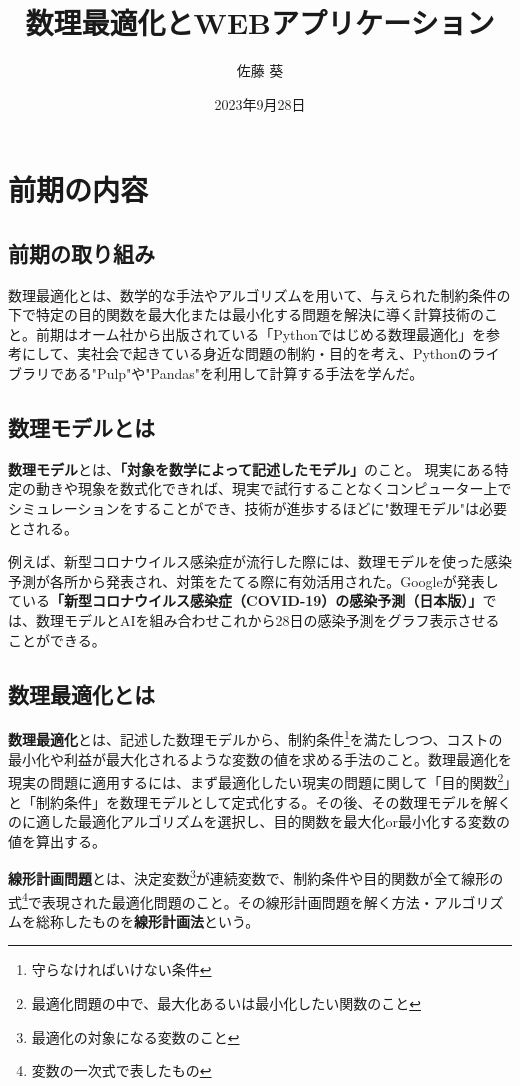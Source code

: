 \documentclass{jsarticle}
\title{数理最適化とWEBアプリケーション}
\date{2023年9月28日}
\author{佐藤 葵}
\begin{document}
\maketitle

\newpage

\tableofcontents
\clearpage

\section{前期の内容}
\vspace\baselineskip	
\subsection{前期の取り組み}
数理最適化とは、数学的な手法やアルゴリズムを用いて、与えられた制約条件の下で特定の目的関数を最大化または最小化する問題を解決に導く計算技術のこと。前期はオーム社から出版されている「Pythonではじめる数理最適化」\cite{参考書}を参考にして、実社会で起きている身近な問題の制約・目的を考え、Pythonのライブラリである"Pulp"や"Pandas"を利用して計算する手法を学んだ。

\subsection{数理モデルとは}
{\bf 数理モデル}とは、{\bf「対象を数学によって記述したモデル」}のこと。 現実にある特定の動きや現象を数式化できれば、現実で試行することなくコンピューター上でシミュレーションをすることができ、技術が進歩するほどに"数理モデル"は必要とされる。
\par 例えば、新型コロナウイルス感染症が流行した際には、数理モデルを使った感染予測が各所から発表され、対策をたてる際に有効活用された。Googleが発表している{\bf「新型コロナウイルス感染症（COVID-19）の感染予測（日本版）」}では、数理モデルとAIを組み合わせこれから28日の感染予測をグラフ表示させることができる。

\subsection{数理最適化とは}
{\bf 数理最適化}とは、記述した数理モデルから、制約条件\footnote{守らなければいけない条件}を満たしつつ、コストの最小化や利益が最大化されるような変数の値を求める手法のこと。数理最適化を現実の問題に適用するには、まず最適化したい現実の問題に関して「目的関数\footnote{最適化問題の中で、最大化あるいは最小化したい関数のこと}」と「制約条件」を数理モデルとして定式化する。その後、その数理モデルを解くのに適した最適化アルゴリズムを選択し、目的関数を最大化or最小化する変数の値を算出する。\par
{\bf 線形計画問題}とは、決定変数\footnote{最適化の対象になる変数のこと}が連続変数で、制約条件や目的関数が全て線形の式\footnote{変数の一次式で表したもの}で表現された最適化問題のこと。その線形計画問題を解く方法・アルゴリズムを総称したものを{\bf 線形計画法}という。
\end{document}
